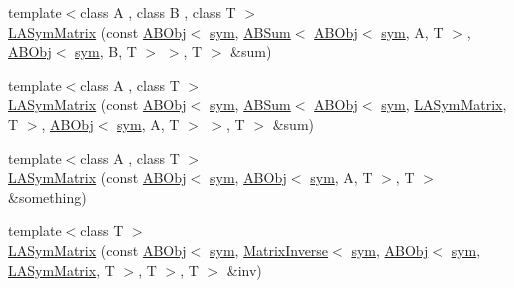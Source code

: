 \begin{DoxyCompactItemize}
\item 
{\footnotesize template$<$class A , class B , class T $>$ }\\\mbox{\hyperlink{classROOT_1_1Minuit2_1_1LASymMatrix_a50f5a1e686ba0b5ac1d296432bdea484}{L\+A\+Sym\+Matrix}} (const \mbox{\hyperlink{classROOT_1_1Minuit2_1_1ABObj}{A\+B\+Obj}}$<$ \mbox{\hyperlink{classROOT_1_1Minuit2_1_1sym}{sym}}, \mbox{\hyperlink{classROOT_1_1Minuit2_1_1ABSum}{A\+B\+Sum}}$<$ \mbox{\hyperlink{classROOT_1_1Minuit2_1_1ABObj}{A\+B\+Obj}}$<$ \mbox{\hyperlink{classROOT_1_1Minuit2_1_1sym}{sym}}, A, T $>$, \mbox{\hyperlink{classROOT_1_1Minuit2_1_1ABObj}{A\+B\+Obj}}$<$ \mbox{\hyperlink{classROOT_1_1Minuit2_1_1sym}{sym}}, B, T $>$ $>$, T $>$ \&sum)
\item 
{\footnotesize template$<$class A , class T $>$ }\\\mbox{\hyperlink{classROOT_1_1Minuit2_1_1LASymMatrix_a252615373ae5ffe035baa9e8221e67e3}{L\+A\+Sym\+Matrix}} (const \mbox{\hyperlink{classROOT_1_1Minuit2_1_1ABObj}{A\+B\+Obj}}$<$ \mbox{\hyperlink{classROOT_1_1Minuit2_1_1sym}{sym}}, \mbox{\hyperlink{classROOT_1_1Minuit2_1_1ABSum}{A\+B\+Sum}}$<$ \mbox{\hyperlink{classROOT_1_1Minuit2_1_1ABObj}{A\+B\+Obj}}$<$ \mbox{\hyperlink{classROOT_1_1Minuit2_1_1sym}{sym}}, \mbox{\hyperlink{classROOT_1_1Minuit2_1_1LASymMatrix}{L\+A\+Sym\+Matrix}}, T $>$, \mbox{\hyperlink{classROOT_1_1Minuit2_1_1ABObj}{A\+B\+Obj}}$<$ \mbox{\hyperlink{classROOT_1_1Minuit2_1_1sym}{sym}}, A, T $>$ $>$, T $>$ \&sum)
\item 
{\footnotesize template$<$class A , class T $>$ }\\\mbox{\hyperlink{classROOT_1_1Minuit2_1_1LASymMatrix_ac807736f91c64875cb01e13050a6c925}{L\+A\+Sym\+Matrix}} (const \mbox{\hyperlink{classROOT_1_1Minuit2_1_1ABObj}{A\+B\+Obj}}$<$ \mbox{\hyperlink{classROOT_1_1Minuit2_1_1sym}{sym}}, \mbox{\hyperlink{classROOT_1_1Minuit2_1_1ABObj}{A\+B\+Obj}}$<$ \mbox{\hyperlink{classROOT_1_1Minuit2_1_1sym}{sym}}, A, T $>$, T $>$ \&something)
\item 
{\footnotesize template$<$class T $>$ }\\\mbox{\hyperlink{classROOT_1_1Minuit2_1_1LASymMatrix_a0089b4055d0d08767d7072657b6f87d5}{L\+A\+Sym\+Matrix}} (const \mbox{\hyperlink{classROOT_1_1Minuit2_1_1ABObj}{A\+B\+Obj}}$<$ \mbox{\hyperlink{classROOT_1_1Minuit2_1_1sym}{sym}}, \mbox{\hyperlink{classROOT_1_1Minuit2_1_1MatrixInverse}{Matrix\+Inverse}}$<$ \mbox{\hyperlink{classROOT_1_1Minuit2_1_1sym}{sym}}, \mbox{\hyperlink{classROOT_1_1Minuit2_1_1ABObj}{A\+B\+Obj}}$<$ \mbox{\hyperlink{classROOT_1_1Minuit2_1_1sym}{sym}}, \mbox{\hyperlink{classROOT_1_1Minuit2_1_1LASymMatrix}{L\+A\+Sym\+Matrix}}, T $>$, T $>$, T $>$ \&inv)

\end{DoxyCompactItemize}
